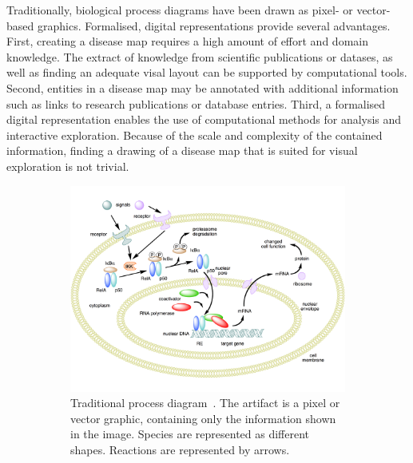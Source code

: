 \documentclass[
	fontsize=10pt, %
	twoside=true, %
	secnumdepth=1, %
  toc=indentunnumbered %
]{kaobook}
\begin{document}
Traditionally, biological process diagrams have been drawn as pixel- or
vector-based graphics. Formalised, digital representations provide several
advantages. First, creating a disease map requires a high amount of effort and
domain knowledge. The extract of knowledge from scientific publications or
datases, as well as finding an adequate visal layout can be supported by
computational tools. Second, entities in a disease map may be annotated with
additional information such as links to research publications or database
entries. Third, a formalised digital representation enables the use of
computational methods for analysis and interactive exploration. Because of the
scale and complexity of the contained information, finding a drawing of a
disease map that is suited for visual exploration is not trivial.

\begin{figure}[h]
  \centering
  \begin{subfigure}{0.4\textwidth}
    \centering
    \includegraphics[width=\textwidth]{NF-kB-mechanism/handdrawn.png}
    \caption{Traditional process
      diagram~\cite{onenglishwikipedia_NFkBMechanismAction_2007}. The artifact
      is a pixel or vector graphic, containing only the information shown in the
      image. Species are represented as different shapes. Reactions are
      represented by arrows.}\label{fig:process-diagram-old-vs-new:handdrawn}
  \end{subfigure}
  \hspace{2em}
  \begin{subfigure}{0.4\textwidth}
    \centering

\end{subfigure}
\end{figure}
\end{document}
